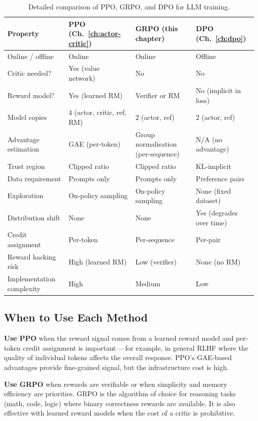 \begin{table}[ht]
\centering
\caption{Detailed comparison of PPO, GRPO, and DPO for LLM training.}
\label{tab:ppo-grpo-dpo}
\footnotesize
\begin{tabular}{@{}lp{3.2cm}p{3.2cm}p{3.2cm}@{}}
\toprule
\textbf{Property} & \textbf{PPO} (Ch.~\ref{ch:actor-critic}) & \textbf{GRPO} (this chapter) & \textbf{DPO} (Ch.~\ref{ch:dpo}) \\
\midrule
Online / offline & Online & Online & Offline \\
Critic needed? & Yes (value network) & No & No \\
Reward model? & Yes (learned RM) & Verifier or RM & No (implicit in loss) \\
Model copies & 4 (actor, critic, ref, RM) & 2 (actor, ref) & 2 (actor, ref) \\
Advantage estimation & GAE (per-token) & Group normalisation (per-sequence) & N/A (no advantage) \\
Trust region & Clipped ratio & Clipped ratio & KL-implicit \\
Data requirement & Prompts only & Prompts only & Preference pairs \\
Exploration & On-policy sampling & On-policy sampling & None (fixed dataset) \\
Distribution shift & None & None & Yes (degrades over time) \\
Credit assignment & Per-token & Per-sequence & Per-pair \\
Reward hacking risk & High (learned RM) & Low (verifier) & None (no RM) \\
Implementation complexity & High & Medium & Low \\
\bottomrule
\end{tabular}
\end{table}

\subsection{When to Use Each Method}

\textbf{Use PPO} when the reward signal comes from a learned reward model and per-token credit assignment is important\,---\,for example, in general RLHF where the quality of individual tokens affects the overall response.  PPO's GAE-based advantages provide fine-grained signal, but the infrastructure cost is high.

\textbf{Use GRPO} when rewards are verifiable or when simplicity and memory efficiency are priorities.  GRPO is the algorithm of choice for reasoning tasks (math, code, logic) where binary correctness rewards are available.  It is also effective with learned reward models when the cost of a critic is prohibitive.

